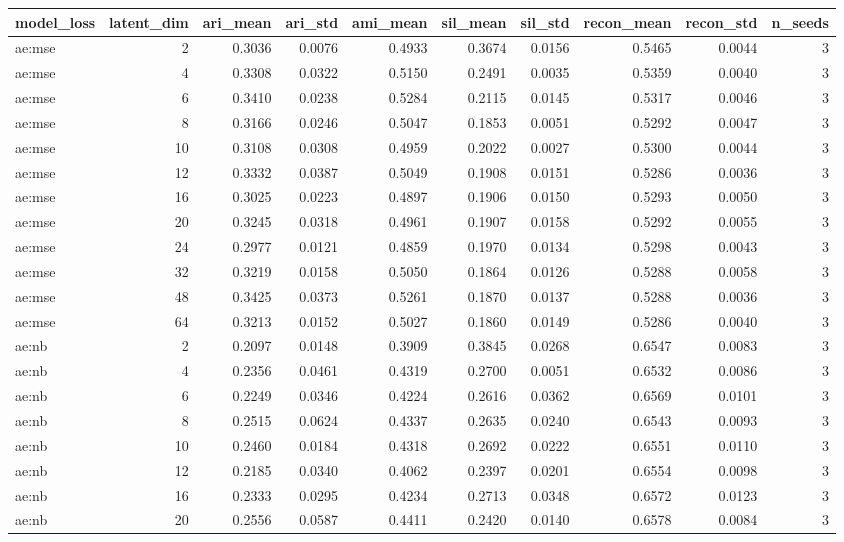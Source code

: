 \begin{tabular}{lrrrrrrrrr}
\toprule
model\_loss & latent\_dim & ari\_mean & ari\_std & ami\_mean & sil\_mean & sil\_std & recon\_mean & recon\_std & n\_seeds \\
\midrule
ae:mse & 2 & 0.3036 & 0.0076 & 0.4933 & 0.3674 & 0.0156 & 0.5465 & 0.0044 & 3 \\
ae:mse & 4 & 0.3308 & 0.0322 & 0.5150 & 0.2491 & 0.0035 & 0.5359 & 0.0040 & 3 \\
ae:mse & 6 & 0.3410 & 0.0238 & 0.5284 & 0.2115 & 0.0145 & 0.5317 & 0.0046 & 3 \\
ae:mse & 8 & 0.3166 & 0.0246 & 0.5047 & 0.1853 & 0.0051 & 0.5292 & 0.0047 & 3 \\
ae:mse & 10 & 0.3108 & 0.0308 & 0.4959 & 0.2022 & 0.0027 & 0.5300 & 0.0044 & 3 \\
ae:mse & 12 & 0.3332 & 0.0387 & 0.5049 & 0.1908 & 0.0151 & 0.5286 & 0.0036 & 3 \\
ae:mse & 16 & 0.3025 & 0.0223 & 0.4897 & 0.1906 & 0.0150 & 0.5293 & 0.0050 & 3 \\
ae:mse & 20 & 0.3245 & 0.0318 & 0.4961 & 0.1907 & 0.0158 & 0.5292 & 0.0055 & 3 \\
ae:mse & 24 & 0.2977 & 0.0121 & 0.4859 & 0.1970 & 0.0134 & 0.5298 & 0.0043 & 3 \\
ae:mse & 32 & 0.3219 & 0.0158 & 0.5050 & 0.1864 & 0.0126 & 0.5288 & 0.0058 & 3 \\
ae:mse & 48 & 0.3425 & 0.0373 & 0.5261 & 0.1870 & 0.0137 & 0.5288 & 0.0036 & 3 \\
ae:mse & 64 & 0.3213 & 0.0152 & 0.5027 & 0.1860 & 0.0149 & 0.5286 & 0.0040 & 3 \\
ae:nb & 2 & 0.2097 & 0.0148 & 0.3909 & 0.3845 & 0.0268 & 0.6547 & 0.0083 & 3 \\
ae:nb & 4 & 0.2356 & 0.0461 & 0.4319 & 0.2700 & 0.0051 & 0.6532 & 0.0086 & 3 \\
ae:nb & 6 & 0.2249 & 0.0346 & 0.4224 & 0.2616 & 0.0362 & 0.6569 & 0.0101 & 3 \\
ae:nb & 8 & 0.2515 & 0.0624 & 0.4337 & 0.2635 & 0.0240 & 0.6543 & 0.0093 & 3 \\
ae:nb & 10 & 0.2460 & 0.0184 & 0.4318 & 0.2692 & 0.0222 & 0.6551 & 0.0110 & 3 \\
ae:nb & 12 & 0.2185 & 0.0340 & 0.4062 & 0.2397 & 0.0201 & 0.6554 & 0.0098 & 3 \\
ae:nb & 16 & 0.2333 & 0.0295 & 0.4234 & 0.2713 & 0.0348 & 0.6572 & 0.0123 & 3 \\
ae:nb & 20 & 0.2556 & 0.0587 & 0.4411 & 0.2420 & 0.0140 & 0.6578 & 0.0084 & 3 \\

\end{tabular}
